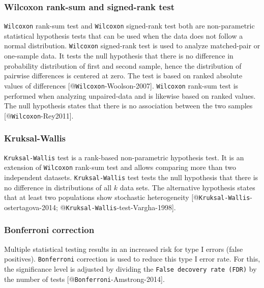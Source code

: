 \documentclass[
  parskip,
  oneside]{scrreprt}
\begin{document}
\hypertarget{wilcoxon-rank-sum-and-signed-rank-test}{%
\subsubsection{Wilcoxon rank-sum and signed-rank
test}\label{wilcoxon-rank-sum-and-signed-rank-test}}

\texttt{Wilcoxon} rank-sum test and \texttt{Wilcoxon} signed-rank test
both are non-parametric statistical hypothesis tests that can be used
when the data does not follow a normal distribution. \texttt{Wilcoxon}
signed-rank test is used to analyze matched-pair or one-sample data. It
tests the null hypothesis that there is no difference in probability
distribution of first and second sample, hence the distribution of
pairwise differences is centered at zero. The test is based on ranked
absolute values of differences {[}@\texttt{Wilcoxon}-Woolson-2007{]}.
\texttt{Wilcoxon} rank-sum test is performed when analyzing
unpaired-data and is likewise based on ranked values. The null
hypothesis states that there is no association between the two samples
{[}@\texttt{Wilcoxon}-Rey2011{]}.

\hypertarget{kruksal-wallis}{%
\subsubsection{Kruksal-Wallis}\label{kruksal-wallis}}

\texttt{Kruksal-Wallis} test is a rank-based non-parametric hypothesis
test. It is an extension of \texttt{Wilcoxon} rank-sum test and allows
comparing more than two independent datasets. \texttt{Kruksal-Wallis}
test tests the null hypothesis that there is no difference in
distributions of all \(k\) data sets. The alternative hypothesis states
that at least two populations show stochastic heterogeneity
{[}@\texttt{Kruksal-Wallis}-ostertagova-2014;
@\texttt{Kruksal-Wallis}-test-Vargha-1998{]}.

\hypertarget{bonferroni-correction}{%
\subsubsection{Bonferroni correction}\label{bonferroni-correction}}

Multiple statistical testing results in an increased risk for type I
errors (false positives). \texttt{Bonferroni} correction is used to
reduce this type I error rate. For this, the significance level is
adjusted by dividing the \texttt{False\ decovery\ rate\ (FDR)} by the
number of tests {[}@\texttt{Bonferroni}-Amstrong-2014{]}.
\end{document}
